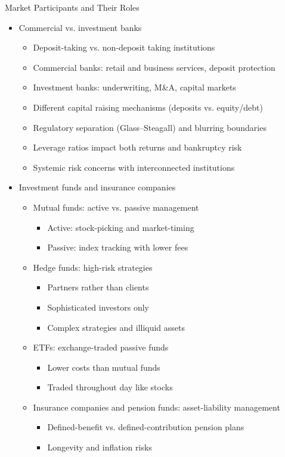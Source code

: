 \documentclass[10pt]{beamer}
\begin{document}
\begin{frame}{Market Participants and Their Roles}
  \begin{itemize}[<+->]
    \item Commercial vs. investment banks
      \begin{itemize}
        \item Deposit-taking vs. non-deposit taking institutions
        \item Commercial banks: retail and business services, deposit protection
        \item Investment banks: underwriting, M\&A, capital markets
        \item Different capital raising mechanisms (deposits vs. equity/debt)
        \item Regulatory separation (Glass–Steagall) and blurring boundaries
        \item Leverage ratios impact both returns and bankruptcy risk
        \item Systemic risk concerns with interconnected institutions
      \end{itemize}
    \item Investment funds and insurance companies
      \begin{itemize}
        \item Mutual funds: active vs. passive management
          \begin{itemize}
            \item Active: stock-picking and market-timing
            \item Passive: index tracking with lower fees
          \end{itemize}
        \item Hedge funds: high-risk strategies
          \begin{itemize}
            \item Partners rather than clients
            \item Sophisticated investors only
            \item Complex strategies and illiquid assets
          \end{itemize}
        \item ETFs: exchange-traded passive funds
          \begin{itemize}
            \item Lower costs than mutual funds
            \item Traded throughout day like stocks
          \end{itemize}
        \item Insurance companies and pension funds: asset-liability management
          \begin{itemize}
            \item Defined-benefit vs. defined-contribution pension plans
            \item Longevity and inflation risks
          \end{itemize}
      \end{itemize}
  \end{itemize}
\end{frame}
\end{document}
